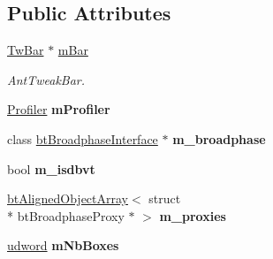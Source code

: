 \subsection*{Public Attributes}
\begin{DoxyCompactItemize}
\item 
\hypertarget{class_bullet_s_a_p_complete_box_pruning_test_a44c05b2cad66a9c1d97de29a2d01e893}{\hyperlink{struct_c_tw_bar}{Tw\+Bar} $\ast$ \hyperlink{class_bullet_s_a_p_complete_box_pruning_test_a44c05b2cad66a9c1d97de29a2d01e893}{m\+Bar}}\label{class_bullet_s_a_p_complete_box_pruning_test_a44c05b2cad66a9c1d97de29a2d01e893}

\begin{DoxyCompactList}\small\item\em Ant\+Tweak\+Bar. \end{DoxyCompactList}\item 
\hypertarget{class_bullet_s_a_p_complete_box_pruning_test_a66666339457dfd6e7839fa1c341b8f4c}{\hyperlink{class_profiler}{Profiler} {\bfseries m\+Profiler}}\label{class_bullet_s_a_p_complete_box_pruning_test_a66666339457dfd6e7839fa1c341b8f4c}

\item 
\hypertarget{class_bullet_s_a_p_complete_box_pruning_test_a04a8fb177f2d813ac9bcc05b0c979d18}{class \hyperlink{classbt_broadphase_interface}{bt\+Broadphase\+Interface} $\ast$ {\bfseries m\+\_\+broadphase}}\label{class_bullet_s_a_p_complete_box_pruning_test_a04a8fb177f2d813ac9bcc05b0c979d18}

\item 
\hypertarget{class_bullet_s_a_p_complete_box_pruning_test_a37a04051b82122e444aebab86c018c13}{bool {\bfseries m\+\_\+isdbvt}}\label{class_bullet_s_a_p_complete_box_pruning_test_a37a04051b82122e444aebab86c018c13}

\item 
\hypertarget{class_bullet_s_a_p_complete_box_pruning_test_a0379ff2df5e7448f38155dcbed2cff2c}{\hyperlink{classbt_aligned_object_array}{bt\+Aligned\+Object\+Array}$<$ struct \\*
bt\+Broadphase\+Proxy $\ast$ $>$ {\bfseries m\+\_\+proxies}}\label{class_bullet_s_a_p_complete_box_pruning_test_a0379ff2df5e7448f38155dcbed2cff2c}

\item 
\hypertarget{class_bullet_s_a_p_complete_box_pruning_test_a96ba38bb1bc22e0bc720b325d1d079a4}{\hyperlink{_ice_types_8h_a44c6f1920ba5551225fb534f9d1a1733}{udword} {\bfseries m\+Nb\+Boxes}}\label{class_bullet_s_a_p_complete_box_pruning_test_a96ba38bb1bc22e0bc720b325d1d079a4}


\end{DoxyCompactItemize}
